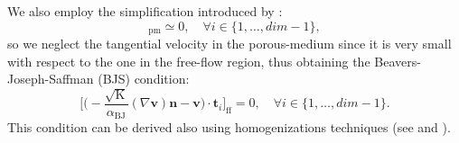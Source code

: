 \begin{itemize}
	We also employ the simplification introduced by \textcite{inter:bjs}:
	\begin{equation}
		[\mathbf{v} \cdot \mathbf{t}_i]_\text{pm} \simeq 0, \quad \forall i \in 
		\{1, 
		\dots, dim-1\},
	\end{equation}
	so we neglect the tangential velocity in the porous-medium since it is very small with 
	respect to the one in the free-flow region, thus obtaining the 
	Beavers-Joseph-Saffman (BJS) condition:
	\begin{equation} \label{eq:bjs}
		\bigg[ \bigg( -\frac{\sqrt{\mathrm{K}}}{\alpha_\text{BJ}} (\nabla \mathbf{v}) 
		\mathbf{n} - \mathbf{v} \bigg) \cdot \mathbf{t}_i \bigg]_\text{ff} = 0, 
		\quad \forall i \in \{1, \dots, dim - 1\}.
	\end{equation}
	This condition can be derived also using homogenizations techniques (see \cite{bjs:homo} and \cite{intro:disca2009}).
\end{itemize} 